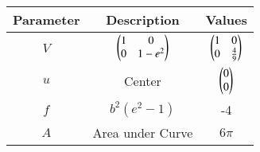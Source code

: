 \begin{tabular}[12pt]{|c|c|c|}
    \hline
    Parameter & Description & Values\\ 
    \hline
    $V$ & $\begin{pmatrix} 1 & 0 \\ 0 & 1-e^{2} \end{pmatrix}$ & $\begin{pmatrix}1 & 0 \\ 0 & \frac{4}{9} \end{pmatrix}$ \\
    \hline
    $u$ & Center & $\begin{pmatrix}0 \\ 0\end{pmatrix}$ \\
    \hline
    $f$ & $b^2(e^2 -1)$ & -4 \\
    \hline
    $A$ & Area under Curve & $6\pi$ \\
    \hline
    \end{tabular}
